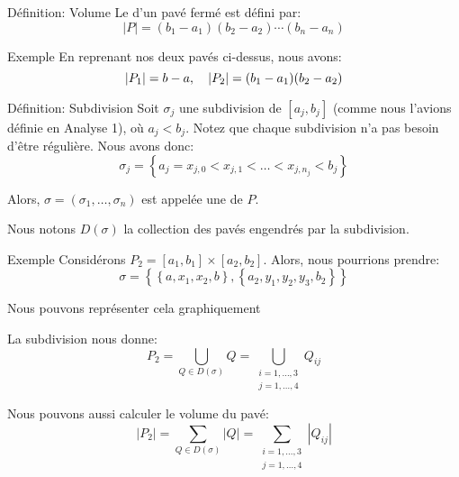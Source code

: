 \documentclass[a4paper]{article}
\begin{document}
\begin{parag}{Définition: Volume}
    Le  d'un pavé fermé est défini par: 
    \[\left|P\right| = \left(b_1 - a_1\right)\left(b_2 - a_2\right)\cdots\left(b_n -a_n\right)\]

    \begin{subparag}{Exemple}
        En reprenant nos deux pavés ci-dessus, nous avons: 
        \[\left|P_1\right| = b - a, \mathspace \left|P_2\right| = \left(b_1 - a_1\right)\left(b_2 - a_2\right)\]
        
    \end{subparag}
\end{parag}

\begin{parag}{Définition: Subdivision}
    Soit $\sigma_j$ une subdivision de $\left[a_j, b_j\right]$ (comme nous l'avions définie en Analyse 1), où $a_j < b_j$. Notez que chaque subdivision n'a pas besoin d'être régulière. Nous avons donc: 
    \[\sigma_j = \left\{a_j = x_{j,0} < x_{j,1} < \ldots < x_{j, n_j} < b_j\right\}\]

    Alors, $\sigma = \left(\sigma_1, \ldots, \sigma_n\right)$ est appelée une  de $P$.

    Nous notons $D\left(\sigma\right)$ la collection des pavés engendrés par la subdivision. 

    \begin{subparag}{Exemple}
        Considérons $P_2 = \left[a_1, b_1\right] \times \left[a_2, b_2\right]$. Alors, nous pourrions prendre: 
        \[\sigma = \left\{\left\{a, x_1, x_2, b\right\}, \left\{a_2, y_1, y_2, y_3, b_2\right\}\right\}\]
        
        Nous pouvons représenter cela graphiquement

        La subdivision nous donne: 
        \[P_2 = \bigcup_{Q \in D\left(\sigma\right)} Q = \bigcup_{\substack{i = 1, \ldots, 3 \\j = 1, \ldots, 4}} Q_{ij}\]
        
        Nous pouvons aussi calculer le volume du pavé: 
        \[\left|P_2\right| = \sum_{Q \in D\left(\sigma\right)}^{} \left|Q\right| = \sum_{\substack{i = 1, \ldots, 3 \\j = 1, \ldots, 4}} \left|Q_{ij}\right|\]
    \end{subparag}
\end{parag}
\end{document}
